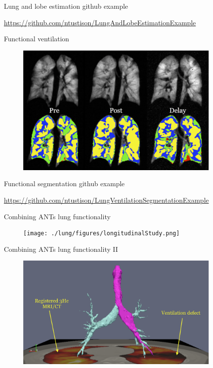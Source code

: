 \documentclass[ignorenonframetext,]{beamer}
\begin{document}
\begin{frame}{Lung and lobe estimation github example}

\url{https://github.com/ntustison/LungAndLobeEstimationExample}

\end{frame}

\begin{frame}{Functional ventilation}

\centering

\begin{figure}
\includegraphics[width=0.9\textwidth]{./lung/figures/prePostAlbuterol.png}
\end{figure}

\end{frame}

\begin{frame}{Functional segmentation github example}

\url{https://github.com/ntustison/LungVentilationSegmentationExample}

\end{frame}

\begin{frame}{Combining ANTs lung functionality}

\centering

\begin{figure}
\texttt{[image: ./lung/figures/longitudinalStudy.png]}
\end{figure}

\end{frame}

\begin{frame}{Combining ANTs lung functionality II}

\centering

\begin{figure}
\includegraphics[width=0.9\textwidth]{./lung/figures/airways.png}
\end{figure}

\hypertarget{refs}{}

\end{frame}
\end{document}

